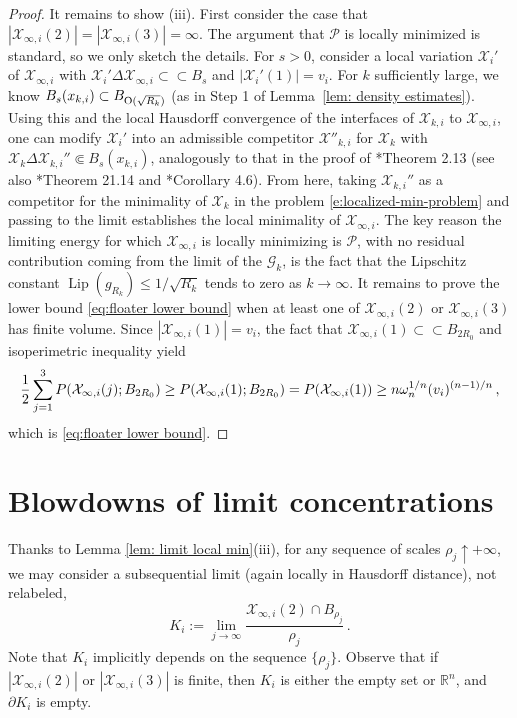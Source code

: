 \documentclass[10pt,reqno]{amsart}
\numberwithin{equation}{section}
\theoremstyle{definition}
\newcommand{\cc}{\subset\!\subset}
\newcommand{\R}{\mathbb{R}}
\newcommand{\cG}{\mathcal{G}}
\DeclareMathOperator{\Lip}{Lip}
\newcommand{\X}{\mathcal{X}}
\begin{document}
{\begin{proof}
 It remains to show (iii). {First consider the case that $|\X_{\infty,i}(2)|=|\X_{\infty,i}(3)|=\infty$.} The argument {that $\mathcal{P}$ is locally minimized} is standard, so we only sketch the details. 
For $s>0$, consider a local variation $\X_{i}'$ of $\X_{\infty, i}$ with $\X_{i}' \Delta \X_{\infty, i} \cc B_s$ {and $|\X_{i}'(1)| = v_i$}. For $k$ sufficiently large, we know $B_s(x_{k, i}) \subset B_{{\rm O}(\sqrt{R_k})}$ (as in Step 1 of Lemma~\ref{lem: density estimates}). Using this and the local Hausdorff convergence of the interfaces of $ \X_{k, i} $ to $ \X_{\infty, i}$, one can modify $\X_{i}'$ into an admissible competitor $\X''_{k,i}$ for $\X_k$ with $\X_k \Delta \X_{k,i}'' \Subset B_s(x_{k, i})$, analogously to that in the proof of \cite{NovPaoTor23}*{Theorem 2.13} (see also \cite{Mag12}*{Theorem 21.14} and \cite{BroNov24}*{Corollary 4.6}). From here, taking $\X_{k,i}''$ as a competitor for the minimality of $\X_k$ in the problem \eqref{e:localized-min-problem} and passing to the limit establishes the local minimality of $\X_{\infty, i}$.
%
The key reason the limiting energy for which  $\X_{\infty, i}$ is locally minimizing is $\mathcal{P}$, with no residual contribution coming from the limit of the $\cG_k$, is  the fact that the Lipschitz constant $\Lip(g_{R_k}) \leq 1/\sqrt{R_k}$ tends to zero as $k \to \infty$. {It remains to prove the lower bound \eqref{eq:floater lower bound} when at least one of $\X_{\infty,i}(2)$ or $\X_{\infty,i}(3)$ has finite volume. Since $|\X_{\infty,i}{(1)}|=v_i$, the fact that $\X_{\infty,i}(1) \cc B_{2R_0}$ and isoperimetric inequality yield
\begin{align}\notag
    \frac{1}{2} \sum_{j=1}^3 P(\X_{\infty,i}(j);B_{2R_0}) \geq P(\X_{\infty,i}(1);B_{2R_0}) = P(\X_{\infty,i}(1))\geq n\omega_n^{1/n} (v_i)^{(n-1)/n}\,,
\end{align}
which is \eqref{eq:floater lower bound}.}
\end{proof}

%
%
%
%


\section{Blowdowns of limit concentrations}\label{sec: blowdown}
Thanks to Lemma \ref{lem: limit local min}(iii), for any sequence of scales $\rho_j \uparrow + \infty$, we may consider a subsequential limit (again locally in Hausdorff distance), not relabeled,
\begin{equation}\label{eq:Ki def}
    K_i := \lim_{j \to \infty} \frac{\X_{\infty,i}(2)\cap B_{\rho_j}}{\rho_j}\,.
\end{equation}
Note that $K_i$ implicitly depends on the sequence $\{\rho_j\}$. 
Observe that if  $|\X_{\infty,i}(2)|$ or $ |\X_{\infty,i}(3)|$ is finite,  then $K_i$ is either the empty set or $\R^n$, and $\partial K_i$ is empty.
\medskip

}
\end{document}
